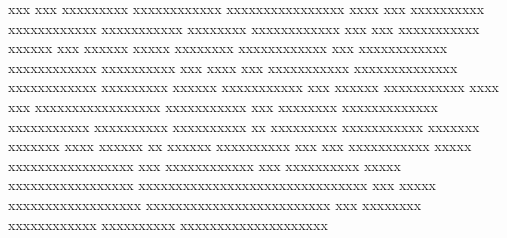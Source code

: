 xxx xxx xxxxxxxxx xxxxxxxxxxxx xxxxxxxxxxxxxxxx xxxx xxx xxxxxxxxxx xxxxxxxxxxxx xxxxxxxxxxx xxxxxxxx xxxxxxxxxxxx xxx xxx xxxxxxxxxxx xxxxxx xxx xxxxxx xxxxx xxxxxxxx xxxxxxxxxxxx xxx xxxxxxxxxxxx xxxxxxxxxxxx xxxxxxxxxx xxx xxxx xxx xxxxxxxxxxx xxxxxxxxxxxxxx xxxxxxxxxxxx xxxxxxxxx xxxxxx xxxxxxxxxxx xxx xxxxxx xxxxxxxxxxx xxxx xxx xxxxxxxxxxxxxxxxx xxxxxxxxxxx xxx xxxxxxxx xxxxxxxxxxxxx xxxxxxxxxxx xxxxxxxxxx xxxxxxxxxx xx xxxxxxxxx xxxxxxxxxxx xxxxxxx xxxxxxx xxxx xxxxxx xx xxxxxx xxxxxxxxxx xxx xxx xxxxxxxxxxx xxxxx xxxxxxxxxxxxxxxxx xxx xxxxxxxxxxxx xxx xxxxxxxxxx xxxxx xxxxxxxxxxxxxxxxx xxxxxxxxxxxxxxxxxxxxxxxxxxxxxxx xxx xxxxx xxxxxxxxxxxxxxxxxx xxxxxxxxxxxxxxxxxxxxxxxxx xxx xxxxxxxx xxxxxxxxxxxx xxxxxxxxxx xxxxxxxxxxxxxxxxxxxx
